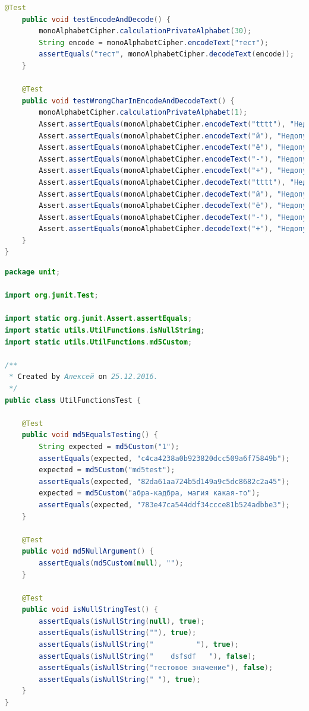 \documentclass[a4paper,12pt]{article}
\begin{document}
\begin{lstlisting}[language=java, caption=код модуля MonoAlphabetCipherTest.java]
    @Test
    public void testEncodeAndDecode() {
        monoAlphabetCipher.calculationPrivateAlphabet(30);
        String encode = monoAlphabetCipher.encodeText("тест");
        assertEquals("тест", monoAlphabetCipher.decodeText(encode));
    }

    @Test
    public void testWrongCharInEncodeAndDecodeText() {
        monoAlphabetCipher.calculationPrivateAlphabet(1);
        Assert.assertEquals(monoAlphabetCipher.encodeText("tttt"), "Недопустимый символ. Шифрование не возможно");
        Assert.assertEquals(monoAlphabetCipher.encodeText("й"), "Недопустимый символ. Шифрование не возможно");
        Assert.assertEquals(monoAlphabetCipher.encodeText("ё"), "Недопустимый символ. Шифрование не возможно");
        Assert.assertEquals(monoAlphabetCipher.encodeText("-"), "Недопустимый символ. Шифрование не возможно");
        Assert.assertEquals(monoAlphabetCipher.encodeText("+"), "Недопустимый символ. Шифрование не возможно");
        Assert.assertEquals(monoAlphabetCipher.decodeText("tttt"), "Недопустимый символ. Расшифровка не возможно");
        Assert.assertEquals(monoAlphabetCipher.decodeText("й"), "Недопустимый символ. Расшифровка не возможно");
        Assert.assertEquals(monoAlphabetCipher.decodeText("ё"), "Недопустимый символ. Расшифровка не возможно");
        Assert.assertEquals(monoAlphabetCipher.decodeText("-"), "Недопустимый символ. Расшифровка не возможно");
        Assert.assertEquals(monoAlphabetCipher.decodeText("+"), "Недопустимый символ. Расшифровка не возможно");
    }
}
\end{lstlisting}

\begin{lstlisting}[language=java, caption=код модуля UtilFunctionsTest.java]
package unit;

import org.junit.Test;

import static org.junit.Assert.assertEquals;
import static utils.UtilFunctions.isNullString;
import static utils.UtilFunctions.md5Custom;

/**
 * Created by Алексей on 25.12.2016.
 */
public class UtilFunctionsTest {

    @Test
    public void md5EqualsTesting() {
        String expected = md5Custom("1");
        assertEquals(expected, "c4ca4238a0b923820dcc509a6f75849b");
        expected = md5Custom("md5test");
        assertEquals(expected, "82da61aa724b5d149a9c5dc8682c2a45");
        expected = md5Custom("абра-кадбра, магия какая-то");
        assertEquals(expected, "783e47ca544ddf34ccce81b524adbbe3");
    }

    @Test
    public void md5NullArgument() {
        assertEquals(md5Custom(null), "");
    }

    @Test
    public void isNullStringTest() {
        assertEquals(isNullString(null), true);
        assertEquals(isNullString(""), true);
        assertEquals(isNullString("          "), true);
        assertEquals(isNullString("    dsfsdf   "), false);
        assertEquals(isNullString("тестовое значение"), false);
        assertEquals(isNullString(" "), true);
    }
}
\end{lstlisting}
\end{document}

